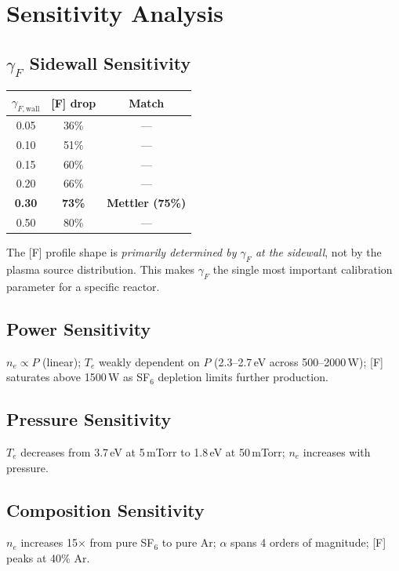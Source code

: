 \documentclass[11pt,a4paper]{article}
\renewcommand{\ne}{n_e}
\newcommand{\Te}{T_e}
\begin{document}
\section{Sensitivity Analysis}
\label{sec:sensitivity}

\subsection{$\gamma_F$ Sidewall Sensitivity}

\begin{center}
\begin{tabular}{ccc}
\toprule
$\gamma_{F,\mathrm{wall}}$ & [F] drop & Match \\
\midrule
0.05 & 36\% & --- \\
0.10 & 51\% & --- \\
0.15 & 60\% & --- \\
0.20 & 66\% & --- \\
\textbf{0.30} & \textbf{73\%} & \textbf{Mettler (75\%)} \\
0.50 & 80\% & --- \\
\bottomrule
\end{tabular}
\end{center}

The [F] profile shape is \emph{primarily determined by $\gamma_F$ at the sidewall}, not by the plasma source distribution.  This makes $\gamma_F$ the single most important calibration parameter for a specific reactor.

\subsection{Power Sensitivity}
$\ne \propto P$ (linear); $\Te$ weakly dependent on $P$ (2.3--2.7\,eV across 500--2000\,W); [F] saturates above 1500\,W as SF$_6$ depletion limits further production.

\subsection{Pressure Sensitivity}
$\Te$ decreases from 3.7\,eV at 5\,mTorr to 1.8\,eV at 50\,mTorr; $\ne$ increases with pressure.

\subsection{Composition Sensitivity}
$\ne$ increases 15$\times$ from pure SF$_6$ to pure Ar; $\alpha$ spans 4 orders of magnitude; [F] peaks at 40\% Ar.
\end{document}
